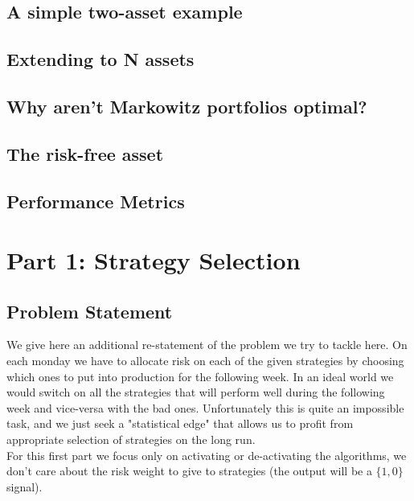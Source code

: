 \documentclass[12pt]{article} %
\numberwithin{equation}{subsection}
\begin{document}
\subsection{A simple two-asset example}



\subsection{Extending to N assets}




\subsection{Why aren't Markowitz portfolios optimal?}




\subsection{The risk-free asset}




\subsection{Performance Metrics}






\section{Part 1: Strategy Selection}

\subsection{Problem Statement}

We give here an additional re-statement of the problem we try to tackle here. On each monday we have to allocate risk on each of the given strategies by choosing which ones to put into production for the following week. In an ideal world we would switch on all the strategies that will perform well during the following week and vice-versa with the bad ones. Unfortunately this is quite an impossible task, and we just seek a "statistical edge" that allows us to profit from appropriate selection of strategies on the long run.\\
For this first part we focus only on activating or de-activating the algorithms, we don't care about the risk weight to give to strategies (the output will be a $\{1,0\}$ signal).
\end{document}
